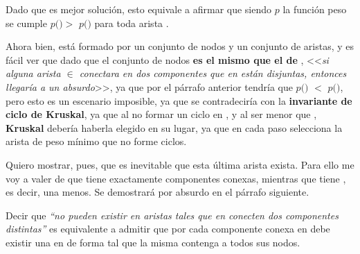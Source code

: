 \documentclass[11pt, a4paper, twoside]{article}
\begin{document}
\begin{paragraph}
Dado que  es mejor solución, esto equivale a afirmar que
siendo $p$ la función peso se cumple $p($$) >$
$p($$)$ para toda arista
.

Ahora bien,  está formado por un conjunto  de
nodos y un conjunto  de aristas, y es fácil ver que dado que
el conjunto de nodos \textbf{es el mismo que el de }, <<\emph{si
alguna arista $\in$ conectara en
 dos componentes que en  están disjuntas,
entonces llegaría a un absurdo}>>, ya que por el párrafo anterior tendría que
$p($$)$ $<$ $p($$)$, pero esto es un
escenario imposible, ya que se contradeciría con la \textbf{invariante de
ciclo de Kruskal}, ya que al no formar  un ciclo en
, y al ser menor que , \textbf{Kruskal}
debería haberla elegido en su lugar, ya que en cada paso selecciona la arista
de peso mínimo que no forme ciclos.

Quiero mostrar, pues, que es inevitable que esta última arista exista. Para
ello me voy a valer de que  tiene exactamente 
componentes conexas, mientras que  tiene ,
es decir, una menos. Se demostrará por absurdo en el párrafo siguiente.

\begin{proposicion}

Decir que \emph{``no pueden existir en  aristas tales que en
 conecten dos componentes distintas''} es equivalente a admitir
que por cada componente conexa en  debe existir una en
 de forma tal que la misma contenga a todos sus nodos. 

\end{proposicion}

\begin{demostracion}


\end{demostracion}
\end{paragraph}
\end{document}
